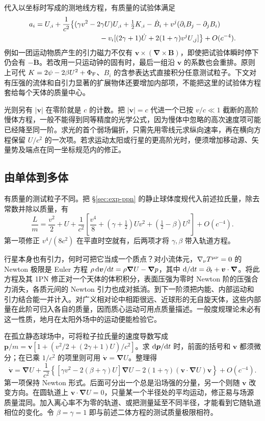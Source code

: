 代入以坐标时写成的测地线方程，有质量的试验体满足
\begin{align}
 a_i={}&U_{,i}+\frac1{c^2}\big\{(\gamma v^2-2\gamma U)U_{,i}
          +\tfrac12K_{,i}-\dot B_i
          +v^j(\p_iB_j-\p_jB_i)\nonumber\\
       &\hspace{27mm}-v_i[(2\gamma+1)\dot U+
                          2(1+\gamma)v^jU_{,j}]\big\}+O(c^{-4}).\label{eq:pn-general-motion}
\end{align}
例如一团运动物质产生的引力磁力不仅有 $\bm v\times(\bm\nabla\times\bm B)$，即使把试验体瞬时停下仍会有 $-\dot{\bm B}$。若改用一只运动钟的固有时，最后一组沿 $\bm v$ 的系数也会重排。原则上可代 $K=2\psi-2\beta U^2+\Phi_{\rm F}$、$B_i$ 的含参表达式直接积分任意测试粒子。下文对有压强的流体和自引力显著的扩展物体还要增加内部项，不能把这里的试验体方程套给每个天体的质量中心。

光则另有 $|\bm v|$ 在零阶就是 $c$ 的计数。把 $|\bm v|=c$ 代进一个已按 $v/c\ll1$ 截断的高阶慢体方程，一般不能得到同等精度的光学公式，因为慢体中忽略的高次速度项可能已经降至同一阶。求光的首个弱场偏折，只需先用零线元求纵向速率，再在横向方程保留 $U/c^2$ 的一次项。若求运动太阳或行星的更高阶光时，便须增加移动源、矢量势及端点在同一坐标规范内的修正。

\subsection{由单体到多体}

有质量的测试粒子不同。把 \S\ref{sec:exp-ppn} 的静止球体度规代入前述拉氏量，除去常数并除以质量，有
\[
 \frac{L}{m}=\frac{v^2}{2}+U
   +\frac{1}{c^2}\left[\frac{v^4}{8}+
   \left(\gamma+\tfrac12\right)Uv^2+
   \left(\tfrac12-\beta\right)U^2\right]+O(c^{-4}).
\]
第一项修正 $v^4/(8c^2)$ 在平直时空就有，后两项才将 $\gamma,\beta$ 带入轨道方程。

行星本身也有引力，何时可把它当成一个质点？对小流体元，$\nabla_\nu T^{\mu\nu}=0$ 的 Newton 极限是 Euler 方程 $\rho\,\dd\bm v/\dd t=\rho\bm\nabla U-\bm\nabla p$，其中 $\dd/\dd t=\partial_t+\bm v\cdot\bm\nabla$。将此方程及其 1PN 修正对一个天体的体积积分，表面压强为零时 Newton 阶的压强合力消失，各质元间的 Newton 引力也成对抵消。到下一阶须把内能、内部运动和引力结合能一并计入。对广义相对论中相距很远、近球形的无自旋天体，这些内部量在此阶可归入各自的质量，因而质心运动可用点质量描述。一般度规理论未必有这一性质，地月在太阳外场中的运动便能检验它。

在孤立静态球场中，可将粒子拉氏量的速度导数写成 $\bm p/m=\bm v[1+(v^2/2+(2\gamma+1)U)/c^2]$。求 $\dd\bm p/\dd t$ 时，前面的括号和 $\bm v$ 都须微分；在已乘 $1/c^2$ 的项里则可用 $\dot{\bm v}=\bm\nabla U$。整理得
\[
 \dot{\bm v}=\bm\nabla U+\frac{1}{c^2}
 \left\{[\gamma v^2-2(\beta+\gamma)U]\bm\nabla U
          -2(1+\gamma)(\bm v\cdot\bm\nabla U)\bm v\right\}
 +O(c^{-4}).
\]
第一项保持 Newton 形式。后面可分出一个总是沿场强的分量，另一个则随 $\bm v$ 改变方向。在圆轨道上 $\bm v\cdot\bm\nabla U=0$，只量某一个半径处的平均运动，修正易与场源质量混同。加入离心率不为零的轨道、或把测量延至不同半径，才能看到它随轨道相位的变化。令 $\beta=\gamma=1$ 即与前述二体方程的测试质量极限相符。

